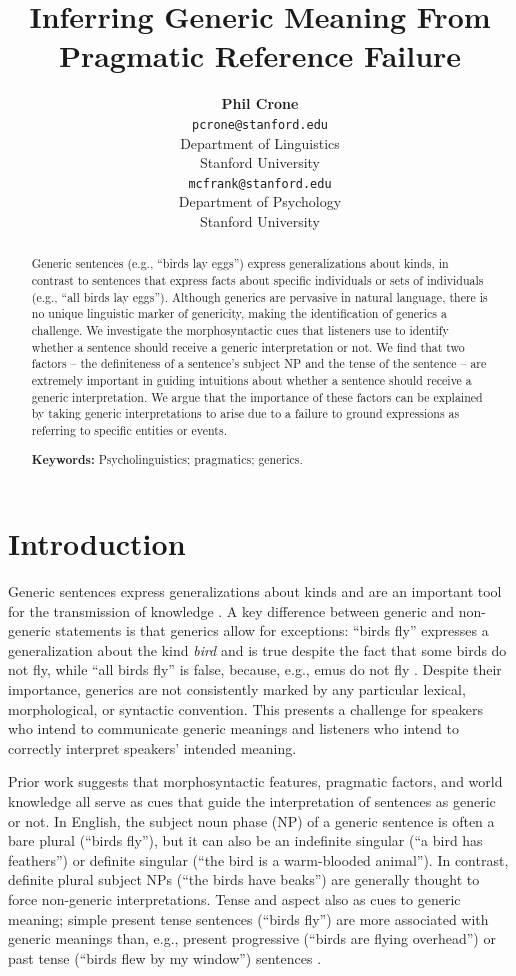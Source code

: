 \documentclass[10pt,letterpaper]{article}
\title{Inferring Generic Meaning From Pragmatic Reference Failure}
\author{{\large \bf Phil Crone} \\
	\texttt{pcrone@stanford.edu}\\
  Department of Linguistics \\
  Stanford University
  \And {\large \bf Michael C. Frank} \\
  \texttt{mcfrank@stanford.edu}\\
  Department of Psychology \\
  Stanford University}
\begin{document}
\maketitle

\begin{abstract}
Generic sentences (e.g., ``birds lay eggs'') express generalizations about kinds, in contrast to sentences that express facts about specific individuals or sets of individuals (e.g., ``all birds lay eggs''). Although generics are pervasive in natural language, there is no unique linguistic marker of genericity, making the identification of generics a challenge. We investigate the morphosyntactic cues that listeners use to identify whether a sentence should receive a generic interpretation or not. We find that two factors -- the definiteness of a sentence's subject NP and the tense of the sentence -- are extremely important in guiding intuitions about whether a sentence should receive a generic interpretation. We argue that the importance of these factors can be explained by taking generic interpretations to arise due to a failure to ground expressions as referring to specific entities or events.

\textbf{Keywords:} Psycholinguistics; pragmatics; generics.
\end{abstract}


\section{Introduction}

Generic sentences express generalizations about kinds and are an important tool for the transmission of knowledge \cite{gelman2003}. A key difference between generic and non-generic statements is that generics allow for exceptions: ``birds fly'' expresses a generalization about the kind \textit{bird} and is true despite the fact that some birds do not fly, while ``all birds fly'' is false, because, e.g., emus do not fly \cite{Prasada:2000}. Despite their importance, generics are not consistently marked by any particular lexical, morphological, or syntactic convention. This presents a challenge for speakers who intend to communicate generic meanings and listeners who intend to correctly interpret speakers' intended meaning.

Prior work suggests that morphosyntactic features, pragmatic factors, and world knowledge all serve as cues that guide the interpretation of sentences as generic or not. In English, the subject noun phase (NP) of a generic sentence is often a bare plural (``birds fly''), but it can also be an indefinite singular (``a bird has feathers'') or definite singular (``the bird is a warm-blooded animal''). In contrast, definite plural subject NPs (``the birds have beaks'') are generally thought to force non-generic interpretations. Tense and aspect also as cues to generic meaning; simple present tense sentences (``birds fly'') are more associated with generic meanings than, e.g., present progressive (``birds are flying overhead'') or past tense (``birds flew by my window'') sentences \cite{Carlson:1977,Krifka:1995,Lyons:1977}.
\end{document}
